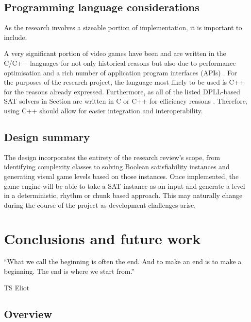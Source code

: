 \documentclass[11pt, a4paper, oneside]{report} %
\begin{document}
\section{Programming language considerations}

As the research involves a sizeable portion of implementation, it is important to include. 

A very significant portion of video games have been and are written in the C/C++ languages for not
only historical reasons but also due to performance optimisation and a rich number of application
program interfaces (APIs) \cite{Gregory:2009}. For the purposes of the research project, the language
most likely to be used is C++ for the reasons already expressed. Furthermore, as all of the listed
DPLL-based SAT solvers in Section are written in C or C++ for efficiency reasons
\cite{zhang2002quest}. Therefore, using C++ should allow for easier integration and
interoperability.

\section{Design summary}

The design incorporates the entirety of the research review's scope, from identifying complexity
classes to solving Boolean satisfiability instances and generating visual game levels based on those
instances. Once implemented, the game engine will be able to take a SAT instance as an input and
generate a level in a deterministic, rhythm or chunk based approach. This may naturally change
during the course of the project as development challenges arise.


\chapter{Conclusions and future work}

\epigraph{``What we call the beginning is often the end. And to make an end is to make a beginning.
The end is where we start from.''}{TS Eliot}

\section{Overview}
\end{document}
